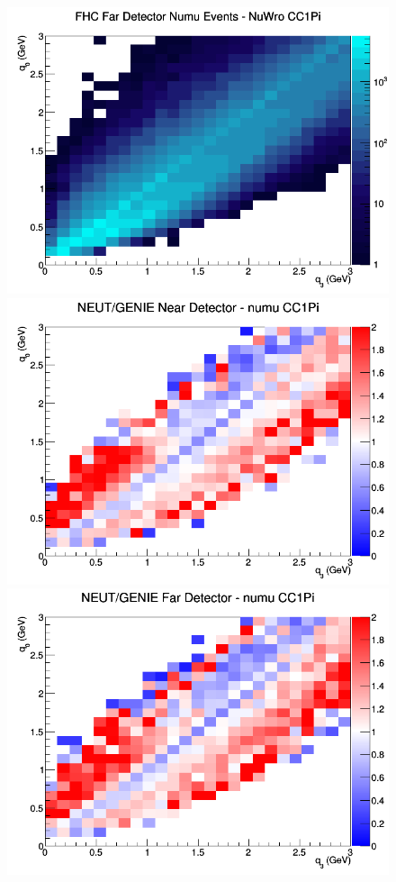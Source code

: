 \documentclass[12pt]{article}
\begin{document}
\begin{figure}[h]
\endminipage
{}
\includegraphics[width=\linewidth]{eff_q0_q3/LAr/CC1Pi_FHC_FD_numu_q3_q0_NuWro.png}
\endminipage
\newline
{}
\includegraphics[width=\linewidth]{eff_q0_q3/LAr/ratios/CC1Pi_NEUT_GENIE_numu_near_q3_q0.png}
\endminipage
{}
\includegraphics[width=\linewidth]{eff_q0_q3/LAr/ratios/CC1Pi_NEUT_GENIE_numu_far_q3_q0.png}

\end{figure}
\end{document}
